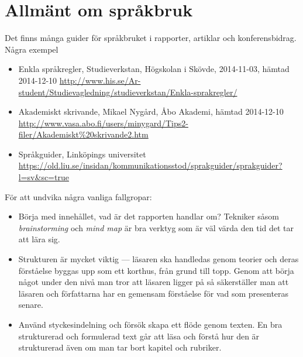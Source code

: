 \documentclass[a4paper,12pt,oneside,final]{extbook}
\begin{document}
\chapter{Allmänt om språkbruk}

Det finns många guider för språkbruket i rapporter, artiklar och konferensbidrag. Några exempel 
\begin{itemize}
\item Enkla språkregler, Studieverkstan, Högskolan i Skövde, 2014-11-03, hämtad 2014-12-10\newline
  \href{http://www.his.se/Ar-student/Studievagledning/studieverkstan/Enkla-sprakregler/}%
       {http://www.his.se/Ar-student/Studievagledning/studieverkstan/Enkla-sprakregler/}
\item Akademiskt skrivande, Mikael Nygård, Åbo Akademi, hämtad 2014-12-10\newline
  \href{http://www.vasa.abo.fi/users/minygard/Tips2-filer/Akademiskt\%20skrivande2.htm}%
       {http://www.vasa.abo.fi/users/minygard/Tips2-filer/Akademiskt\%20skrivande2.htm}
\item Språkguider, Linköpings universitet\newline
  \href{https://old.liu.se/insidan/kommunikationsstod/sprakguider/sprakguider?l=sv\&sc=true}%
       {https://old.liu.se/insidan/kommunikationsstod/sprakguider/sprakguider?l=sv\&sc=true}
\end{itemize}
För att undvika några vanliga fallgropar:
\begin{itemize}
\item Börja med innehållet, vad är det rapporten handlar om? Tekniker
  såsom \emph{brainstorming} och \emph{mind map} är bra verktyg som är
  väl värda den tid det tar att lära sig.
\item Strukturen är mycket viktig --- läsaren ska handledas genom
  teorier och deras förståelse byggas upp som ett korthus, från grund
  till topp. Genom att börja något under den nivå man tror att läsaren
  ligger på så säkerställer man att läsaren och författarna har en
  gemensam förståelse för vad som presenteras senare.
\item Använd styckesindelning och försök skapa ett flöde genom
  texten. En bra strukturerad och formulerad text går att läsa och
  förstå hur den är strukturerad även om man tar bort kapitel och
  rubriker.
\end{itemize}
\end{document}
